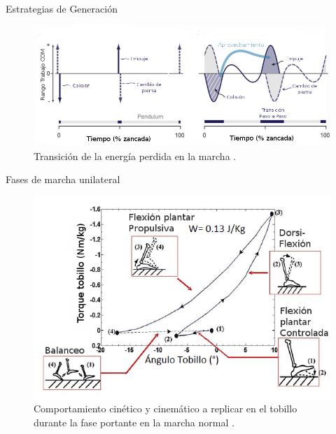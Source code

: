 \documentclass[10pt]{beamer}
\begin{document}
\begin{frame}{Estrategias de Generación}

\begin{figure}
\begin{centering}
\includegraphics[scale=0.35]{Feathergraphics/transicion2}
\par\end{centering}
\caption{Transición de la energía perdida en la marcha \cite{Collins2010}.}
\end{figure}
\end{frame}

\begin{frame}{Fases de marcha unilateral}

\begin{center}
\begin{figure}
\begin{centering}
\includegraphics[scale=0.5]{Feathergraphics/cinneticatobillo}
\par\end{centering}
\caption{Comportamiento cinético y cinemático a replicar en el tobillo durante
la fase portante en la marcha normal \cite{Au2009}.}
\end{figure}
\par\end{center}

\end{frame}
\end{document}
